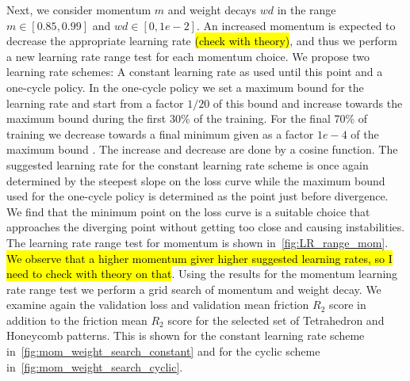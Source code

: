 Next, we consider momentum $m$ and weight decays $wd$ in the range $m \in [0.85,
0.99]$ and $wd \in [0, 1e-2]$. An increased momentum is expected to decrease the
appropriate learning rate \hl{(check with theory)}, and thus we perform a new learning rate range test
for each momentum choice. We propose two learning rate schemes: A constant
learning rate as used until this point and a one-cycle policy. In the one-cycle
policy we set a maximum bound for the learning rate and start from a factor
$1/20$ of this bound and increase towards the maximum bound during the first
30\% of the training. For the final 70\% of training we decrease towards a final
minimum given as a factor $1e-4$ of the maximum bound . The increase and
decrease are done by a cosine function. The suggested learning rate for the
constant learning rate scheme is once again determined by the steepest slope on
the loss curve while the maximum bound used for the one-cycle policy is
determined as the point just before divergence. We find that the minimum point
on the loss curve is a suitable choice that approaches the diverging point
without getting too close and causing instabilities. The learning rate range
test for momentum is shown in~\cref{fig:LR_range_mom}. \hl{We observe that a higher momentum giver higher suggested learning rates, so I need to check with theory on that}. Using the results for the momentum learning rate range test we perform a grid search of momentum and
weight decay. We examine again the validation loss and validation mean friction
$R_2$ score in addition to the friction mean $R_2$ score for the selected set of
Tetrahedron and Honeycomb patterns. This is shown for the constant learning rate
scheme in~\cref{fig:mom_weight_search_constant} and for the cyclic scheme in~\cref{fig:mom_weight_search_cyclic}.

